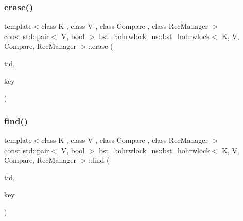 \mbox{\label{classbst__hohrwlock__ns_1_1bst__hohrwlock_ab3f51b453cc5cb462e9d78a9c0403ca3}} 
\subsubsection{\texorpdfstring{erase()}{erase()}}
{\footnotesize\ttfamily template$<$class K , class V , class Compare , class Rec\+Manager $>$ \\
const std\+::pair$<$ V, bool $>$ \hyperlink{classbst__hohrwlock__ns_1_1bst__hohrwlock}{bst\+\_\+hohrwlock\+\_\+ns\+::bst\+\_\+hohrwlock}$<$ K, V, Compare, Rec\+Manager $>$\+::erase (\begin{DoxyParamCaption}\item[{const int}]{tid,  }\item[{const K \&}]{key }\end{DoxyParamCaption})}

\mbox{\label{classbst__hohrwlock__ns_1_1bst__hohrwlock_ab81a9b0759d366baddcbc300ea950a6d}} 
\subsubsection{\texorpdfstring{find()}{find()}}
{\footnotesize\ttfamily template$<$class K , class V , class Compare , class Rec\+Manager $>$ \\
const std\+::pair$<$ V, bool $>$ \hyperlink{classbst__hohrwlock__ns_1_1bst__hohrwlock}{bst\+\_\+hohrwlock\+\_\+ns\+::bst\+\_\+hohrwlock}$<$ K, V, Compare, Rec\+Manager $>$\+::find (\begin{DoxyParamCaption}\item[{const int}]{tid,  }\item[{const K \&}]{key }\end{DoxyParamCaption})}

\mbox{\label{classbst__hohrwlock__ns_1_1bst__hohrwlock_a594fc73b875a953bbbabe66ad1fd486f}} 
